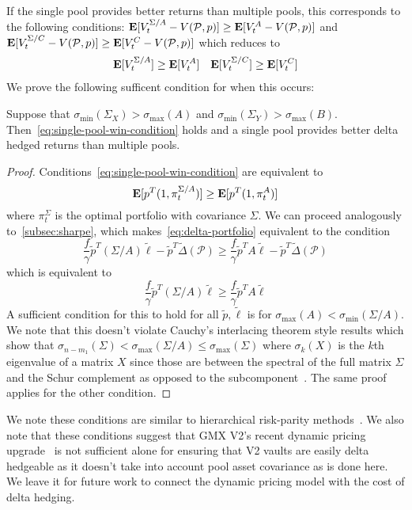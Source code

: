 If the single pool provides better returns than multiple pools, this corresponds to the following conditions: $\mathop{\bf E{}}[V_t^{\Sigma / A} - V(\mathcal{P}, p)] \geq \mathop{\bf E{}}[V_t^{A}-V(\mathcal{P}, p)]$ and $\mathop{\bf E{}}[V_t^{\Sigma / C} - V(\mathcal{P}, p)] \geq \mathop{\bf E{}}[V_t^{C}-V(\mathcal{P}, p)]$
which reduces to
\begin{align}\label{eq:single-pool-win-condition}
     \mathop{\bf E{}}[V_t^{\Sigma / A}] \geq \mathop{\bf E{}}[V_t^{A}] &&    \mathop{\bf E{}}[V_t^{\Sigma / C}] \geq \mathop{\bf E{}}[V_t^{C}]
\end{align}
We prove the following sufficent condition for when this occurs:
\begin{claim}\label{claim:schur}
    Suppose that $\sigma_{\min}(\Sigma_X) > \sigma_{\max}(A)$ and $\sigma_{\min}(\Sigma_Y) > \sigma_{\max}(B)$.
    Then~\eqref{eq:single-pool-win-condition} holds and a single pool provides better delta hedged returns than multiple pools.
\end{claim}
\begin{proof}
Conditions~\eqref{eq:single-pool-win-condition} are equivalent to
\begin{equation}\label{eq:delta-portfolio}
\mathop{\bf E{}}[p^T(1, \pi_t^{\Sigma / A})] \geq \mathop{\bf E{}}[p^T(1, \pi_t^{A})]
\end{equation}
where $\pi^{\Sigma}_t$ is the optimal portfolio with covariance $\Sigma$.
We can proceed analogously to~\ref{subsec:sharpe}, which makes~\eqref{eq:delta-portfolio} equivalent to the condition
\[
\frac{f}{\gamma} \tilde{p}^T (\Sigma/A) \tilde{\ell} - \tilde{p}^T \tilde{\Delta}(\mathcal{P}) \geq \frac{f}{\gamma}\tilde{p}^T A \tilde{\ell} - \tilde{p}^T \tilde{\Delta}(\mathcal{P})
\]
which is equivalent to
\[
\frac{f}{\gamma}\tilde{p}^T (\Sigma / A) \tilde{\ell} \geq \frac{f}{\gamma}\tilde{p}^T A \tilde{\ell}
\]
A sufficient condition for this to hold for all $\tilde{p}, \tilde{\ell}$ is for $\sigma_{\max}(A) < \sigma_{\min}(\Sigma / A)$.
We note that this doesn't violate Cauchy's interlacing theorem style results which show that $ \sigma_{n-m_1}(\Sigma)< \sigma_{\max}(\Sigma / A) \leq \sigma_{\max}(\Sigma)$
where $\sigma_{k}(X)$ is the $k$th eigenvalue of a matrix $X$ since those are between the spectral of the full matrix $\Sigma$ and the Schur complement as opposed to the subcomponent~\cite[Ch. 2]{zhang2006schur}. 
The same proof applies for the other condition.
\end{proof}

\noindent We note these conditions are similar to hierarchical risk-parity methods~\cite{cotton2024schur, lopez2016building}.
We also note that these conditions suggest that GMX V2's recent dynamic pricing upgrade~\cite{gmx-dynamic-price-impact} is not sufficient alone for ensuring that V2 vaults are easily delta hedgeable as it doesn't take into account pool asset covariance as is done here.
We leave it for future work to connect the dynamic pricing model with the cost of delta hedging.